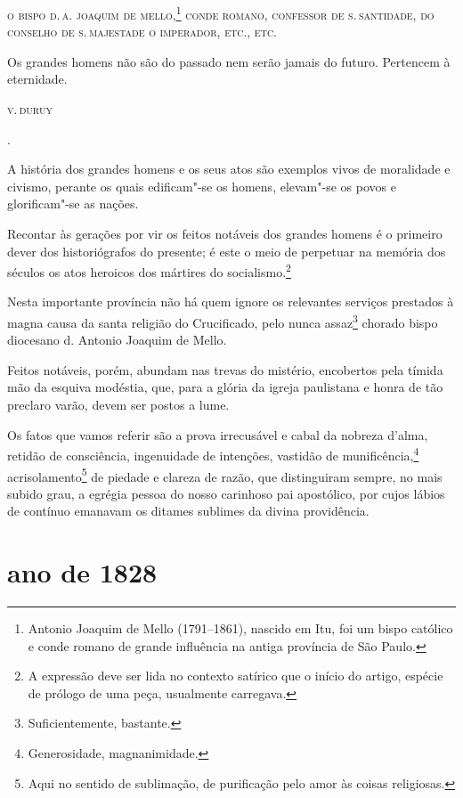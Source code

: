 \noindent\textsc{o bispo d.\,a. joaquim de mello},\footnote{Antonio Joaquim de Mello
  (1791--1861), nascido em Itu, foi um bispo católico e conde romano de
  grande influência na antiga província de São Paulo.} \textsc{conde romano,
  confessor de s.\,santidade, do conselho de s.\,majestade o imperador,
  etc., etc.}

\epigraph{Os grandes homens não são do passado
nem serão jamais do futuro. Pertencem à eternidade.}{\textsc{v.\,duruy}\footnotemark}.

A história dos grandes homens e os seus atos são exemplos vivos de
moralidade e civismo, perante os quais edificam"-se os homens, elevam"-se
os povos e glorificam"-se as nações.

Recontar às gerações por vir os feitos notáveis dos grandes homens é o
primeiro dever dos historiógrafos do presente; é este o meio de
perpetuar na memória dos séculos os atos heroicos dos mártires do
socialismo.\footnote{A expressão deve ser lida no contexto satírico
  que o início do artigo, espécie de prólogo de uma peça, usualmente
  carregava.}

Nesta importante província não há quem ignore os relevantes serviços
prestados à magna causa da santa religião do Crucificado, pelo nunca
assaz\footnote{Suficientemente, bastante.} chorado bispo diocesano d.
Antonio Joaquim de Mello.

Feitos notáveis, porém, abundam nas trevas do mistério, encobertos pela
tímida mão da esquiva modéstia, que, para a glória da igreja paulistana
e honra de tão preclaro varão, devem ser postos a lume.

Os fatos que vamos referir são a prova irrecusável e cabal da nobreza
d'alma, retidão de consciência, ingenuidade de intenções, vastidão de
munificência,\footnote{Generosidade, magnanimidade.}
acrisolamento\footnote{Aqui no sentido de sublimação, de purificação
  pelo amor às coisas religiosas.} de piedade e clareza de razão, que
distinguiram sempre, no mais subido grau, a egrégia pessoa do nosso
carinhoso pai apostólico, por cujos lábios de contínuo emanavam os
ditames sublimes da divina providência.

\section*{ano de 1828}

